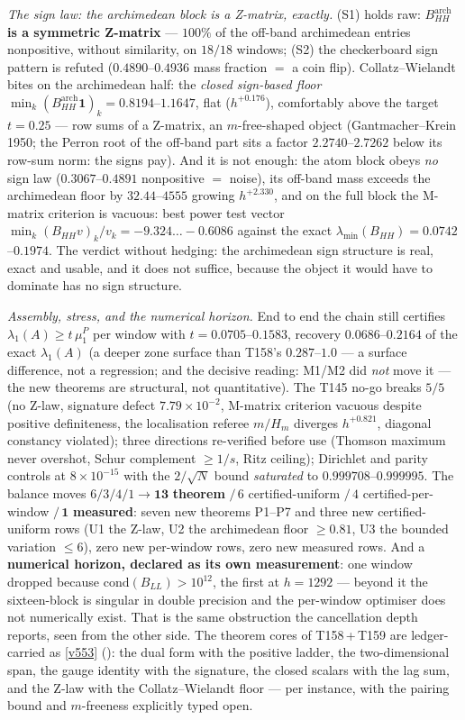 \documentclass[11pt,a4paper]{article}
\begin{document}
\emph{The sign law: the archimedean block is a Z-matrix, exactly.} (S1) holds raw:
\textbf{$B^{\mathrm{arch}}_{HH}$ is a symmetric Z-matrix} --- $100\%$ of the
off-band archimedean entries nonpositive, without similarity, on $18/18$ windows;
(S2) the checkerboard sign pattern is refuted ($0.4890$--$0.4936$ mass fraction $=$
a coin flip). Collatz--Wielandt bites on the archimedean half: the \emph{closed
sign-based floor} $\min_k(B^{\mathrm{arch}}_{HH}\mathbf 1)_k=0.8194$--$1.1647$,
flat ($h^{+0.176}$), comfortably above the target $t=0.25$ --- row sums of a
Z-matrix, an $m$-free-shaped object (Gantmacher--Krein 1950; the Perron root of
the off-band part sits a factor $2.2740$--$2.7262$ below its row-sum norm: the
signs pay). And it is not enough: the atom block obeys \emph{no} sign law
($0.3067$--$0.4891$ nonpositive $=$ noise), its off-band mass exceeds the
archimedean floor by $32.44$--$4555$ growing $h^{+2.330}$, and on the full block
the M-matrix criterion is vacuous: best power test vector
$\min_k(B_{HH}v)_k/v_k=-9.324\ldots-0.6086$ against the exact
$\lambda_{\min}(B_{HH})=0.0742$--$0.1974$. The verdict without hedging: the
archimedean sign structure is real, exact and usable, and it does not suffice,
because the object it would have to dominate has no sign structure.

\emph{Assembly, stress, and the numerical horizon.} End to end the chain still
certifies $\lambda_1(A)\ge t\,\mu^P_1$ per window with $t=0.0705$--$0.1583$,
recovery $0.0686$--$0.2164$ of the exact $\lambda_1(A)$ (a deeper zone surface
than T158's $0.287$--$1.0$ --- a surface difference, not a regression; and the
decisive reading: M1/M2 did \emph{not} move it --- the new theorems are
structural, not quantitative). The T145 no-go breaks $5/5$ (no Z-law, signature
defect $7.79\times10^{-2}$, M-matrix criterion vacuous despite positive
definiteness, the localisation referee $m/H_m$ diverges $h^{+0.821}$, diagonal
constancy violated); three directions re-verified before use (Thomson maximum
never overshot, Schur complement $\ge1/s$, Ritz ceiling); Dirichlet and parity
controls at $8\times10^{-15}$ with the $2/\sqrt N$ bound \emph{saturated} to
$0.999708$--$0.999995$. The balance moves $6/3/4/1\to\mathbf{13}$
\textbf{theorem} $/\,6$ certified-uniform $/\,4$ certified-per-window $/\,\mathbf 1$
\textbf{measured}: seven new theorems P1--P7 and three new certified-uniform rows
(U1 the Z-law, U2 the archimedean floor $\ge0.81$, U3 the bounded variation
$\le6$), zero new per-window rows, zero new measured rows. And a
\textbf{numerical horizon, declared as its own measurement}: one window dropped
because $\mathrm{cond}(B_{LL})>10^{12}$, the first at $h=1292$ --- beyond it the
sixteen-block is singular in double precision and the per-window optimiser does
not numerically exist. That is the same obstruction the cancellation depth
reports, seen from the other side. The theorem cores of T158\,+\,T159 are
ledger-carried as \vref{v553}
(): the dual form with the positive ladder,
the two-dimensional span, the gauge identity with the signature, the closed
scalars with the lag sum, and the Z-law with the Collatz--Wielandt floor ---
per instance, with the pairing bound and $m$-freeness explicitly typed open.
\end{document}
